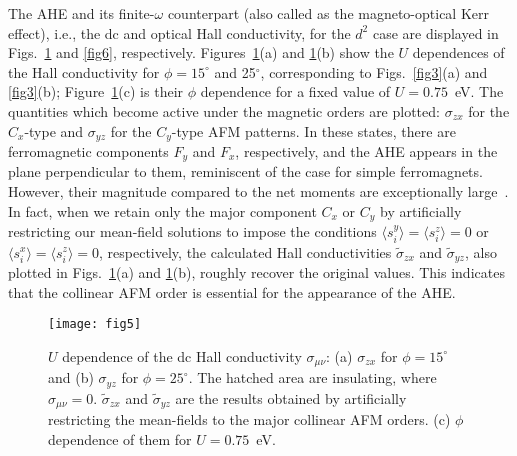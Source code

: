 \documentclass[aps,twocolumn,prb,preprintnumbers,amsmath,amssymb]{revtex4-2}
\begin{document}
The AHE and its finite-$\omega$ counterpart (also called as the magneto-optical Kerr effect), 
 i.e., the dc and optical Hall conductivity, 
for the $d^2$ case are displayed in Figs.~\ref{fig5} and \ref{fig6}, respectively.  
Figures~\ref{fig5}(a) and \ref{fig5}(b) show the $U$ dependences of the Hall conductivity 
 for $\phi=15^\circ$ and 25$^\circ$, corresponding to Figs.~\ref{fig3}(a) and \ref{fig3}(b);
 Figure~\ref{fig5}(c) is their $\phi$ dependence for a fixed value of $U=0.75$~eV. 
The quantities which become active under the magnetic orders are plotted: 
 $\sigma_{zx}$ for the $C_x$-type and $\sigma_{yz}$ for the $C_y$-type AFM patterns. 
In these states, there are ferromagnetic components $F_y$ and $F_x$, respectively, 
 and the AHE appears in the plane perpendicular to them, reminiscent of the case for simple ferromagnets. 
However, their magnitude compared to the net moments are exceptionally large~\cite{nagaosa}.
In fact, when we retain only the major component $C_x$ or $C_y$ 
 by artificially restricting our mean-field solutions to impose the conditions 
 $\langle s_i^y \rangle = \langle s_i^z \rangle =0$ or $\langle s_i^x \rangle = \langle s_i^z \rangle=0$, respectively, 
 the calculated Hall conductivities $\tilde{\sigma}_{zx}$ and $\tilde{\sigma}_{yz}$, also plotted in Figs.~\ref{fig5}(a) and \ref{fig5}(b), 
  roughly recover the original values. 
This indicates that the collinear AFM order is essential for the appearance of the AHE. 
\begin{figure}[t]
\begin{center}
\texttt{[image: fig5]}
\end{center}
\caption{$U$ dependence of the dc Hall conductivity $\sigma_{\mu\nu}$: (a) $\sigma_{zx}$ for $\phi=15^\circ$ and 
(b) $\sigma_{yz}$ for $\phi=25^\circ$. 
The hatched area are insulating, where $\sigma_{\mu\nu}=0$. 
 $\tilde{\sigma}_{zx}$ and $\tilde{\sigma}_{yz}$ are the results obtained by 
 artificially restricting the mean-fields to the major collinear AFM orders. 
(c) $\phi$ dependence of them for $U=0.75$~eV.}
\label{fig5}
\end{figure}
\end{document}
